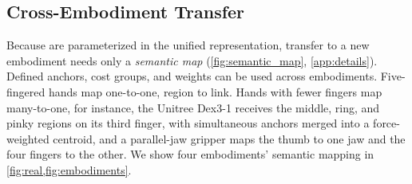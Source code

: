 
\subsection{Cross-Embodiment Transfer}
\label{sec:method:embodiment}

Because \fca are parameterized in the unified representation, transfer to a new embodiment needs only a \emph{semantic map} (\cref{fig:semantic_map}, \cref{app:details}). Defined anchors, cost groups, and weights can be used across embodiments. Five-fingered hands map one-to-one, region to link. Hands with fewer fingers map many-to-one, for instance, the Unitree Dex3-1 receives the middle, ring, and pinky regions on its third finger, with simultaneous anchors merged into a force-weighted centroid, and a parallel-jaw gripper maps the thumb to one jaw and the four fingers to the other. We show four embodiments' semantic mapping in \cref{fig:real,fig:embodiments}.

